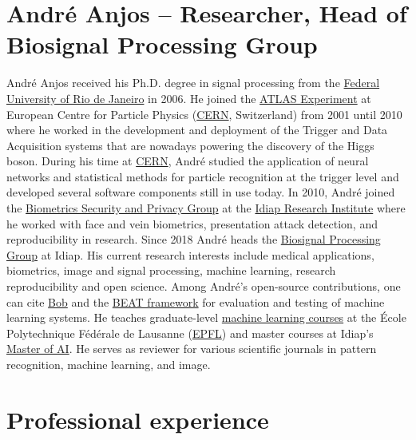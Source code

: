 \documentclass[11pt,a4paper,sans]{moderncv}
\begin{document}
\section{André Anjos -- Researcher, Head of Biosignal Processing Group}

André Anjos received his Ph.D. degree in signal processing from the
\href{https://www.ufrj.br/}{Federal University of Rio de Janeiro} in 2006. He
joined the \href{https://atlas.ch/}{ATLAS Experiment} at European Centre for
Particle Physics (\href{https://www.cern.ch/}{CERN}, Switzerland) from 2001
until 2010 where he worked in the development and deployment of the Trigger and
Data Acquisition systems that are nowadays powering the discovery of the Higgs
boson. During his time at \href{https://www.cern.ch/}{CERN}, André studied the
application of neural networks and statistical methods for particle recognition
at the trigger level and developed several software components still in use
today. In 2010, André joined the
\href{https://www.idiap.ch/en/scientific-research/biometrics-security-and-privacy}{Biometrics Security and Privacy Group} at the
\href{https://www.idiap.ch/en/scientific-research/biosignal-processing}{Idiap
Research Institute} where he worked with face and vein biometrics, presentation
attack detection, and reproducibility in research.  Since 2018 André heads the
\href{https://www.idiap.ch/en/scientific-research/biosignal-processing}{Biosignal
Processing Group} at Idiap. His current research interests include medical
applications, biometrics, image and signal processing, machine learning,
research reproducibility and open science.  Among André's open-source
contributions, one can cite \href{https://www.idiap.ch/software/bob}{Bob} and
the \href{https://www.idiap.ch/software/beat}{BEAT framework} for evaluation and
testing of machine learning systems. He teaches graduate-level
\href{http://edu.epfl.ch/coursebook/en/fundamentals-in-statistical-pattern-recognition-EE-612}{machine learning
courses} at the École Polytechnique Fédérale de Lausanne
(\href{https://www.epfl.ch/}{EPFL}) and master courses at Idiap's
\href{https://master-ai.ch/}{Master of AI}. He serves as reviewer for various
scientific journals in pattern recognition, machine learning, and image.



\section{Professional experience}
\end{document}

